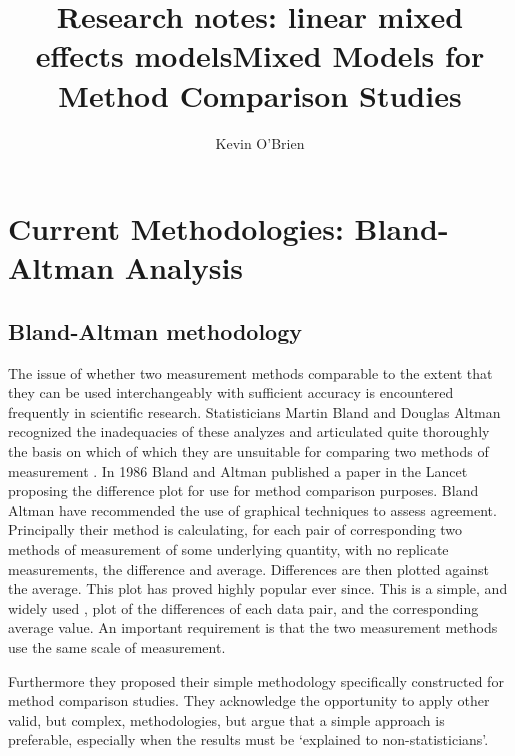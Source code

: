 \documentclass[12pt, a4paper]{report}
\title{Research notes: linear mixed effects models}
\author{ } \date{ }
\theoremstyle{plain}
\theoremstyle{definition}
\theoremstyle{remark}
\begin{document}
	\author{Kevin O'Brien}
	\title{Mixed Models for Method Comparison Studies}
	\tableofcontents
	
	\newpage
	\chapter{Current Methodologies: Bland-Altman Analysis}
	\section{Bland-Altman methodology}

		
		The issue of whether two measurement methods comparable to the 	extent that they can be used interchangeably with sufficient accuracy is encountered frequently in scientific research.
	Statisticians Martin Bland and Douglas Altman recognized the inadequacies of these analyzes and
	articulated quite thoroughly the basis on which of which they are unsuitable for comparing two methods of measurement \citep*{BA83}. In 1986 Bland and Altman published a paper in the Lancet proposing the difference plot for use for method comparison purposes. Bland Altman have recommended the use of graphical techniques to assess agreement. Principally their method is calculating, for each pair of corresponding two methods of measurement of some
	underlying quantity, with no replicate measurements, the
	difference and average. Differences are then plotted against the
	average. This plot has proved highly popular ever since. This is a simple, and widely used , plot of the differences of each data pair, and the corresponding average value. An important requirement is that the	two measurement methods use the same scale of measurement.
		
	Furthermore they proposed their simple methodology specifically constructed for method comparison studies. They acknowledge the opportunity to apply other valid, but complex, methodologies, but argue that a simple approach is preferable, especially when the results must be `explained to non-statisticians'.
	
\end{document}
